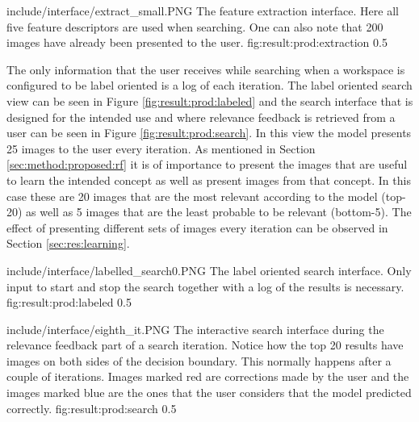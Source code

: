 \singlefigurenear
{include/interface/extract_small.PNG}
{The feature extraction interface. Here all five feature descriptors are used when searching. One can also note that 200 images have already been presented to the user.}
{fig:result:prod:extraction}
{0.5}

The only information that the user receives while searching when a workspace is configured to be label oriented is a log of each iteration. The label oriented search view can be seen in Figure \ref{fig:result:prod:labeled} and the search interface that is designed for the intended use and where relevance feedback is retrieved from a user can be seen in Figure \ref{fig:result:prod:search}. In this view the model presents 25 images to the user every iteration. As mentioned in Section \ref{sec:method:proposed:rf} it is of importance to present the images that are useful to learn the intended concept as well as present images from that concept. In this case these are 20 images that are the most relevant according to the model (top-20) as well as 5 images that are the least probable to be relevant (bottom-5). The effect of presenting different sets of images every iteration can be observed in Section \ref{sec:res:learning}.

\singlefigurenear
{include/interface/labelled_search0.PNG}
{The label oriented search interface. Only input to start and stop the search together with a log of the results is necessary.}
{fig:result:prod:labeled}
{0.5}

\singlefigurenear
{include/interface/eighth_it.PNG}
{The interactive search interface during the relevance feedback part of a search iteration. Notice how the top 20 results have images on both sides of the decision boundary. This normally happens after a couple of iterations. Images marked red are corrections made by the user and the images marked blue are the ones that the user considers that the model predicted correctly.}
{fig:result:prod:search}
{0.5}


